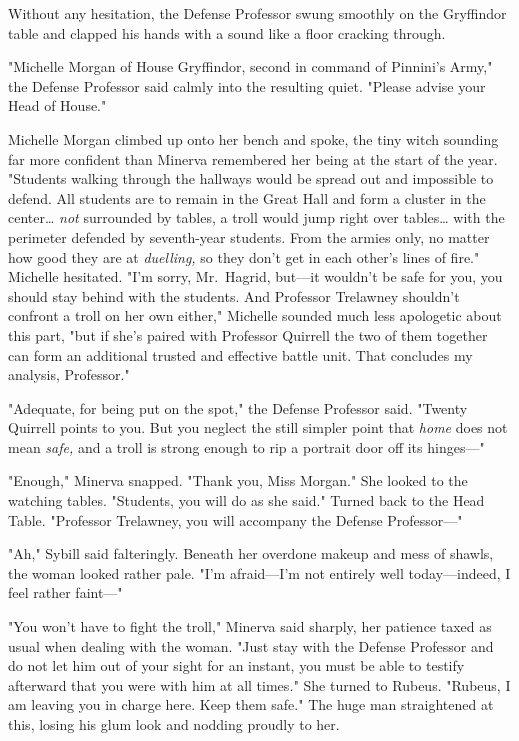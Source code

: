 Without any hesitation, the Defense Professor swung smoothly on the Gryffindor 
table and clapped his hands with a sound like a floor cracking through.

"Michelle Morgan of House Gryffindor, second in command of Pinnini's Army," the 
Defense Professor said calmly into the resulting quiet. "Please advise your 
Head of House."

Michelle Morgan climbed up onto her bench and spoke, the tiny witch sounding 
far more confident than Minerva remembered her being at the start of the year. 
"Students walking through the hallways would be spread out and impossible to 
defend. All students are to remain in the Great Hall and form a cluster in the 
center{\ldots} \emph{not} surrounded by tables, a troll would jump right over 
tables{\ldots} with the perimeter defended by seventh-year students. From the 
armies only, no matter how good they are at \emph{duelling,} so they don't get 
in each other's lines of fire." Michelle hesitated. "I'm sorry, Mr.~Hagrid, 
but---it wouldn't be safe for you, you should stay behind with the students. 
And Professor Trelawney shouldn't confront a troll on her own either," Michelle 
sounded much less apologetic about this part, "but if she's paired with 
Professor Quirrell the two of them together can form an additional trusted and 
effective battle unit. That concludes my analysis, Professor."

"Adequate, for being put on the spot," the Defense Professor said. "Twenty 
Quirrell points to you. But you neglect the still simpler point that 
\emph{home} does not mean \emph{safe,} and a troll is strong enough to rip a 
portrait door off its hinges---"

"Enough," Minerva snapped. "Thank you, Miss Morgan." She looked to the watching 
tables. "Students, you will do as she said." Turned back to the Head Table. 
"Professor Trelawney, you will accompany the Defense Professor---"

"Ah," Sybill said falteringly. Beneath her overdone makeup and mess of shawls, 
the woman looked rather pale. "I'm afraid---I'm not entirely well 
today---indeed, I feel rather faint---"

"You won't have to fight the troll," Minerva said sharply, her patience taxed 
as usual when dealing with the woman. "Just stay with the Defense Professor and 
do not let him out of your sight for an instant, you must be able to testify 
afterward that you were with him at all times\emph{.}" She turned to Rubeus. 
"Rubeus, I am leaving you in charge here. Keep them safe." The huge man 
straightened at this, losing his glum look and nodding proudly to her.


